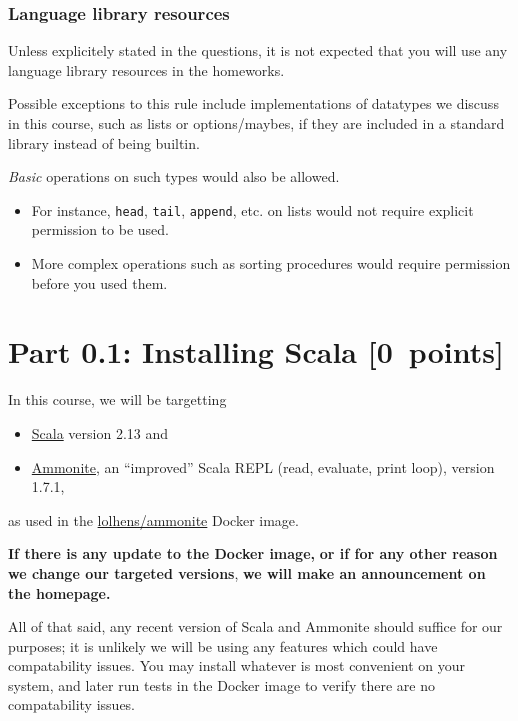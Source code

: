 \documentclass[11pt]{article}
\begin{document}
\subsubsection*{Language library resources}
\label{sec:org12a669b}

Unless explicitely stated in the questions,
it is not expected that you will use any language library resources
in the homeworks.

Possible exceptions to this rule include implementations
of datatypes we discuss in this course, such as lists
or options/maybes, if they are included in a standard library
instead of being builtin.

\emph{Basic} operations on such types would also be allowed.
\begin{itemize}
\item For instance, \texttt{head}, \texttt{tail}, \texttt{append}, etc. on lists
would not require explicit permission to be used.
\item More complex operations such as sorting procedures
would require permission before you used them.
\end{itemize}

\section*{Part 0.1: Installing Scala                  [0 points]}
\label{sec:org628aa76}
In this course, we will be targetting
\begin{itemize}
\item \href{https://scala-lang.org}{Scala} version 2.13 and
\item \href{https://ammonite.io}{Ammonite}, an “improved” Scala REPL (read, evaluate, print loop),
version 1.7.1,
\end{itemize}
as used in the
\href{https://hub.docker.com/r/lolhens/ammonite/}{lolhens/ammonite}
Docker image.

\begin{center}
\textbf{If there is any update to the Docker image,}
\textbf{or if for any other reason we change our targeted versions},
\textbf{we will make an announcement on the homepage.}
\end{center}

All of that said, any recent version of Scala and Ammonite
should suffice for our purposes; it is unlikely we will
be using any features which could have compatability issues.
You may install whatever is most convenient on your system,
and later run tests in the Docker image
to verify there are no compatability issues.
\end{document}
